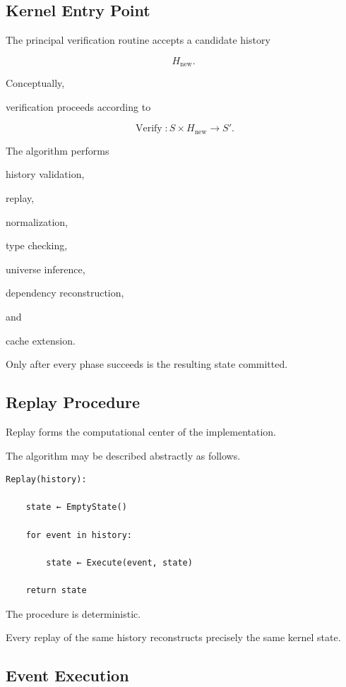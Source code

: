 \documentclass[12pt,oneside]{article}
\theoremstyle{definition}
\theoremstyle{remark}
\begin{document}
\subsection{Kernel Entry Point}

The principal verification routine accepts a candidate history

\[
H_{\mathrm{new}}.
\]

Conceptually,

verification proceeds according to

\[
\operatorname{Verify}
:
S
\times
H_{\mathrm{new}}
\rightarrow
S'.
\]

The algorithm performs

history validation,

replay,

normalization,

type checking,

universe inference,

dependency reconstruction,

and

cache extension.

Only after every phase succeeds is the resulting state committed.


\subsection{Replay Procedure}

Replay forms the computational center of the implementation.

The algorithm may be described abstractly as follows.

\begin{verbatim}
Replay(history):

    state ← EmptyState()

    for event in history:

        state ← Execute(event, state)

    return state
\end{verbatim}

The procedure is deterministic.

Every replay of the same history reconstructs precisely the same kernel state.


\subsection{Event Execution}
\end{document}

